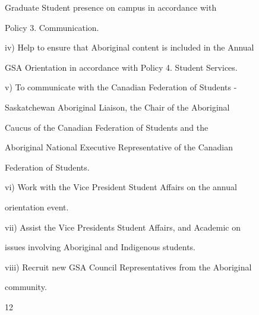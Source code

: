                   Graduate  Student  presence  on  campus  in  accordance  with  

                   Policy 3. Communication.   

  

         iv)       Help to ensure that Aboriginal content is included in the Annual  

                   GSA Orientation in accordance with Policy 4. Student Services.   

  

         v)        To  communicate  with  the  Canadian  Federation  of  Students  - 

                   Saskatchewan Aboriginal  Liaison, the  Chair of  the  Aboriginal  

                   Caucus   of   the   Canadian   Federation   of   Students   and   the  

                   Aboriginal National Executive Representative of the Canadian  

                   Federation of Students.   

         vi)       Work  with  the  Vice  President  Student  Affairs  on  the  annual  

                   orientation event.  

         vii)      Assist  the  Vice  Presidents  Student  Affairs,  and  Academic  on  

                   issues involving Aboriginal and Indigenous students.  

         viii)     Recruit new GSA Council Representatives from the Aboriginal  

                   community.  

                     

  

  

  

  

  

  

  

  

  

  

  

  



                                                         12  

                                        

